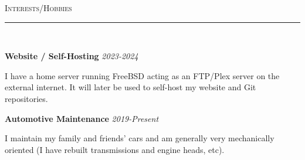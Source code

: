 \documentclass[letterpaper,10pt]{article}
\newcommand{\lineover}{ 
          \begin{changemargin}{-0.05in}{-0.05in} 
                  \vspace*{-8pt} 
                \noindent\rule{\textwidth}{0.4pt} \\ 
                  \vspace*{-2pt} 
        \end{changemargin} 
}
\newenvironment{changemargin}[2]{%
    \begin{list}{}{%
      \setlength{\topsep}{0pt}%
      \setlength{\leftmargin}{0pt}%
      \setlength{\rightmargin}{#2}%
      \setlength{\listparindent}{\parindent}%
      \setlength{\itemindent}{\parindent}%
      \setlength{\parsep}{\parskip}%
    }%
  \item[]}{\end{list} 
}
\newcommand{\header}[1]{ 
          \begin{changemargin}{-0.5in}{-0.5in} 
                  \scshape{#1}\\ 
        \lineover 
        \end{changemargin} 
}
\newcommand{\jobtitle}[4]{ 
          \textbf{#1} \emph{#2} \hfill \emph{#3}\\ 
}
\newcommand{\jobdescription}[1]{ 
          \begin{changemargin}{0.15in}{0.15in} 
      \smallskip 
                  {#1} 
      \medskip 
        \end{changemargin} 
}
\begin{document}
  \vspace{10pt}
  \header{Interests/Hobbies} 

  \jobtitle{Website / Self-Hosting}{}{2023-2024}{*}
  \jobdescription{I have a home server running FreeBSD acting as an FTP/Plex server on the external internet. It will later be used to self-host my website and Git repositories.}

  \jobtitle{Automotive Maintenance}{}{2019-Present}{*}
  \jobdescription{I maintain my family and friends' cars and am generally very mechanically oriented (I have rebuilt transmissions and engine heads, etc).}
\end{document}
